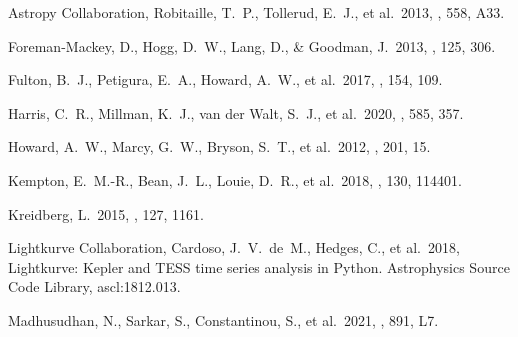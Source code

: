 
\begin{thebibliography}{}

  Astropy Collaboration, Robitaille, T.~P., Tollerud, E.~J., et al.\ 2013,
  \aap, 558, A33.

  Foreman-Mackey, D., Hogg, D.~W., Lang, D., \& Goodman, J.\ 2013,
  \pasp, 125, 306.

  Fulton, B.~J., Petigura, E.~A., Howard, A.~W., et al.\ 2017,
  \aj, 154, 109.

  Harris, C.~R., Millman, K.~J., van der Walt, S.~J., et al.\ 2020,
  \nat, 585, 357.

  Howard, A.~W., Marcy, G.~W., Bryson, S.~T., et al.\ 2012,
  \apjs, 201, 15.

  Kempton, E.~M.-R., Bean, J.~L., Louie, D.~R., et al.\ 2018,
  \pasp, 130, 114401.

  Kreidberg, L.\ 2015,
  \pasp, 127, 1161.

  Lightkurve Collaboration, Cardoso, J.~V.~de~M., Hedges, C., et al.\ 2018,
  Lightkurve: Kepler and TESS time series analysis in Python.
  Astrophysics Source Code Library, ascl:1812.013.

  Madhusudhan, N., Sarkar, S., Constantinou, S., et al.\ 2021,
  \apjl, 891, L7.


\end{thebibliography}

